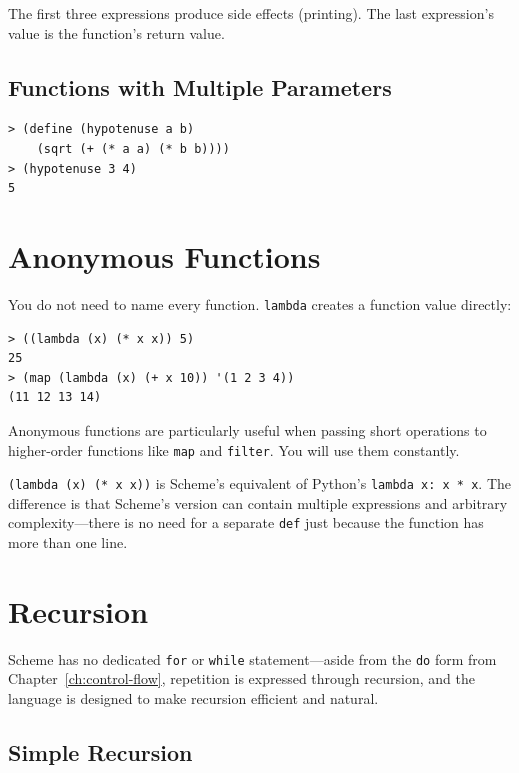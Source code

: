 The first three expressions produce side effects (printing). The last expression's value is the function's return value.

\subsection{Functions with Multiple Parameters}

\begin{lstlisting}[style=repl]
> (define (hypotenuse a b)
    (sqrt (+ (* a a) (* b b))))
> (hypotenuse 3 4)
5
\end{lstlisting}

\section{Anonymous Functions}

You do not need to name every function. \texttt{lambda} creates a function value directly:

\begin{lstlisting}[style=repl]
> ((lambda (x) (* x x)) 5)
25
> (map (lambda (x) (+ x 10)) '(1 2 3 4))
(11 12 13 14)
\end{lstlisting}

Anonymous functions are particularly useful when passing short operations to higher-order functions like \texttt{map} and \texttt{filter}. You will use them constantly.

\begin{note}
\texttt{(lambda (x) (* x x))} is Scheme's equivalent of Python's \texttt{lambda x: x * x}. The difference is that Scheme's version can contain multiple expressions and arbitrary complexity---there is no need for a separate \texttt{def} just because the function has more than one line.
\end{note}

\section{Recursion}

Scheme has no dedicated \texttt{for} or \texttt{while} statement---aside from the \texttt{do} form from Chapter~\ref{ch:control-flow}, repetition is expressed through recursion, and the language is designed to make recursion efficient and natural.

\subsection{Simple Recursion}

